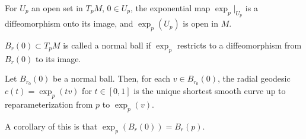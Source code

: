 \documentclass[../main.tex]{subfiles}
\begin{document}
\begin{prop}
    For $U_p$ an open set in $T_pM$, $0\in U_p$, the exponential map
    $\exp_p|_{U_p}$ is a diffeomorphism onto its image, and $\exp_p(U_p)$ is
    open in $M$.
\end{prop}
$B_r(0)\subset T_pM$ is called a normal ball if $\exp_p$ restricts to a
diffeomorphism from $B_r(0)$ to its image.

\begin{theorem}
    Let $B_{r_0}(0)$ be a normal ball. Then, for each $v\in B_{r_0}(0)$, the
    radial geodesic $c(t) = \exp_p(tv)$ for $t\in[0,1]$ is the unique shortest
    smooth curve up to reparameterization from $p$ to $\exp_p(v)$.
\end{theorem}

A corollary of this is that $\exp_p(B_r(0)) = B_r(p)$.
\end{document}
